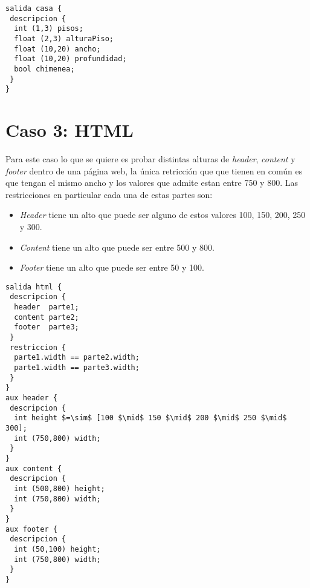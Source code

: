 \begin{lstlisting}[mathescape]
salida casa {
 descripcion { 
  int (1,3) pisos; 
  float (2,3) alturaPiso; 
  float (10,20) ancho; 
  float (10,20) profundidad; 
  bool chimenea; 
 } 
}
\end{lstlisting}

\section{Caso 3: HTML}
\label{ejemplo:html}
Para este caso lo que se quiere es probar distintas alturas de \emph{header}, \emph{content}
y \emph{footer} dentro de una página web, la única retricción que que tienen en 
común es que tengan el mismo ancho y los valores que admite estan entre 750 y 800.
Las restricciones en particular cada una de estas partes son:

\begin{itemize}
\item{\emph{Header} tiene un alto que puede ser alguno de estos valores 100, 150, 200, 250 y 300.}
\item{\emph{Content} tiene un alto que puede ser entre 500 y 800.}
\item{\emph{Footer} tiene un alto que puede ser entre 50 y 100.}
\end{itemize}

\begin{lstlisting}[mathescape]
salida html { 
 descripcion { 
  header  parte1;
  content parte2; 
  footer  parte3; 
 } 
 restriccion { 
  parte1.width == parte2.width; 
  parte1.width == parte3.width; 
 } 
} 
aux header { 
 descripcion { 
  int height $=\sim$ [100 $\mid$ 150 $\mid$ 200 $\mid$ 250 $\mid$ 300]; 
  int (750,800) width; 
 } 
} 
aux content { 
 descripcion { 
  int (500,800) height; 
  int (750,800) width; 
 } 
}
aux footer {
 descripcion { 
  int (50,100) height; 
  int (750,800) width; 
 } 
}
\end{lstlisting}
